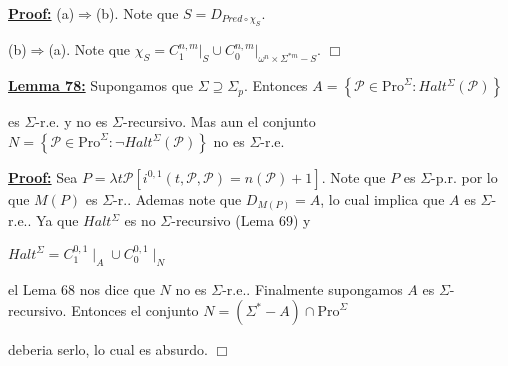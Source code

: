 \textbf{\underline{Proof:}} (a)\(\Rightarrow \)(b)\(.\) Note que \(S=D_{Pred\circ \chi _{S}}.\)

(b)\(\Rightarrow \)(a). Note que \(\chi _{S}=C_{1}^{n,m}\mathrm{\mid }_{S}\cup C_{0}^{n,m}\mathrm{\mid }_{\omega ^{n}\times \Sigma ^{\ast m}-S}\). \(\Box\)

\textbf{\underline{Lemma 78:}} Supongamos que \(\Sigma \supseteq \Sigma _{p}.\) Entonces
\(\displaystyle A=\left\{ \mathcal{P}\in \mathrm{Pro}^{\Sigma }:Halt^{\Sigma }(\mathcal{P} )\right\} \)

es \(\Sigma \)-r.e. y no es \(\Sigma \)-recursivo. Mas aun el conjunto
\(\displaystyle N=\left\{ \mathcal{P}\in \mathrm{Pro}^{\Sigma }:\lnot Halt^{\Sigma }( \mathcal{P})\right\} \)
no es \(\Sigma \)-r.e.


\textbf{\underline{Proof:}} Sea \(P=\lambda t\mathcal{P}\left[ i^{0,1}(t,\mathcal{P},\mathcal{P})=n( \mathcal{P})+1\right] \). Note que \(P\) es \(\Sigma \)-p.r. por lo que \(M(P)\) es \(\Sigma \)-r.. Ademas note que \(D_{M(P)}=A\), lo cual implica que \(A\) es \( \Sigma \)-r.e.. Ya que \(Halt^{\Sigma }\) es no \(\Sigma \)-recursivo (Lema 69) y

\(\displaystyle Halt^{\Sigma }=C_{1}^{0,1}\mid _{A}\cup C_{0}^{0,1}\mid _{N} \)

el Lema 68 nos dice que \(N\) no es \(\Sigma \)-r.e.. Finalmente supongamos \(A\) es \(\Sigma \)-recursivo. Entonces el conjunto
\(\displaystyle N=\left( \Sigma ^{\ast }-A\right) \cap \mathrm{Pro}^{\Sigma } \)

deberia serlo, lo cual es absurdo. \(\Box\)
